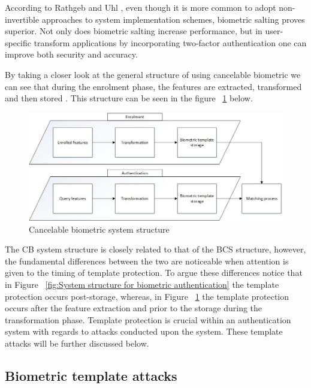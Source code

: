 According to Rathgeb and Uhl \cite{Rathgeb2011}, even though it is more common to adopt non-invertible approaches to system implementation schemes, biometric salting proves superior. Not only does biometric salting increase performance, but in user-specific transform applications by incorporating two-factor authentication one can improve both security and accuracy.

By taking a closer look at the general structure of using cancelable biometric we can see that during the enrolment phase, the features are extracted, transformed and then stored \cite{Patel2015}. This structure can be seen in the figure ~\ref{fig:Cancelable biometric system structure} below.


\begin{figure}[htbp!] 
\centering    
\includegraphics[width=1.0\textwidth]{Chapter2/Figs/Cancelable_biometric_system_structure.jpg}
\caption[Cancelable biometric system structure]{Cancelable biometric system structure}
\label{fig:Cancelable biometric system structure}
\end{figure}

The CB system structure is closely related to that of the BCS structure, however, the fundamental differences between the two are noticeable when attention is given to the timing of template protection. To argue these differences notice that in Figure ~\ref{fig:System structure for biometric authentication} the template protection occurs post-storage, whereas, in Figure ~\ref{fig:Cancelable biometric system structure} the template protection occurs after the feature extraction and prior to the storage during the transformation phase. Template protection is crucial within an authentication system with regards to attacks conducted upon the system. These template attacks will be further discussed below.

    \subsection{ Biometric template attacks}
    
